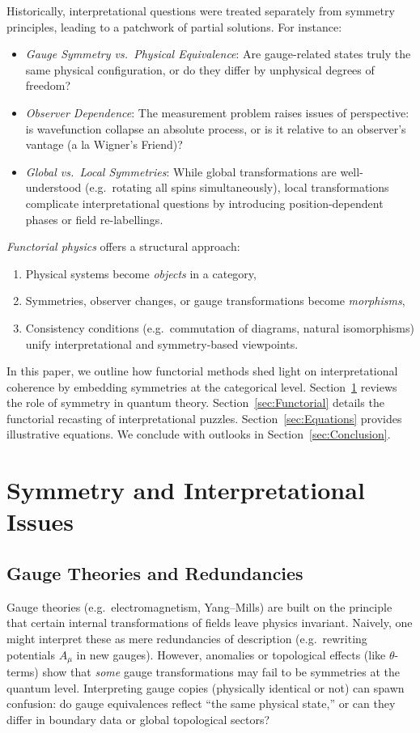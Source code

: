 \documentclass[12pt]{article}
\begin{document}
Historically, interpretational questions were treated separately from symmetry principles, 
leading to a patchwork of partial solutions. For instance:
\begin{itemize}[label=$\bullet$]
\item \emph{Gauge Symmetry vs.\ Physical Equivalence}: Are gauge-related states truly the 
same physical configuration, or do they differ by unphysical degrees of freedom?
\item \emph{Observer Dependence}: The measurement problem raises issues of perspective: 
is wavefunction collapse an absolute process, or is it relative to an observer's vantage (a la Wigner's Friend)?
\item \emph{Global vs.\ Local Symmetries}: While global transformations are well-understood 
(e.g.\ rotating all spins simultaneously), local transformations complicate interpretational 
questions by introducing position-dependent phases or field re-labellings.
\end{itemize}

\emph{Functorial physics} offers a structural approach: 
\begin{enumerate}[label=(\roman*)]
    \item Physical systems become \emph{objects} in a category,
    \item Symmetries, observer changes, or gauge transformations become \emph{morphisms},
    \item Consistency conditions (e.g.\ commutation of diagrams, natural isomorphisms) 
          unify interpretational and symmetry-based viewpoints.
\end{enumerate}

In this paper, we outline how functorial methods shed light on interpretational coherence 
by embedding symmetries at the categorical level. Section~\ref{sec:Symmetry} reviews the 
role of symmetry in quantum theory. Section~\ref{sec:Functorial} details the functorial 
recasting of interpretational puzzles. Section~\ref{sec:Equations} provides illustrative 
equations. We conclude with outlooks in Section~\ref{sec:Conclusion}.

\section{Symmetry and Interpretational Issues}
\label{sec:Symmetry}
\subsection{Gauge Theories and Redundancies}
Gauge theories (e.g.\ electromagnetism, Yang--Mills) are built on the principle that certain 
internal transformations of fields leave physics invariant. Naively, one might interpret 
these as mere redundancies of description (e.g.\ rewriting potentials $A_\mu$ in new 
gauges). However, anomalies or topological effects (like $\theta$-terms) show that 
\emph{some} gauge transformations may fail to be symmetries at the quantum level. 
Interpreting gauge copies (physically identical or not) can spawn confusion: do gauge 
equivalences reflect “the same physical state,” or can they differ in boundary data 
or global topological sectors?
\end{document}
